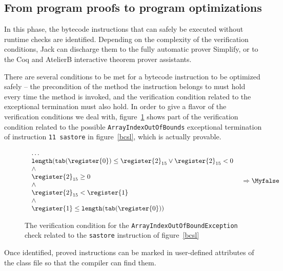 

\subsection{From program proofs to program optimizations }
\label{proofs}
In this phase, the bytecode instructions that can safely be executed without runtime checks are identified. Depending on the complexity of the verification conditions, Jack can discharge them to the fully automatic prover Simplify, or to the Coq and AtelierB interactive theorem prover assistants.

There are several conditions to be met for a bytecode instruction to be optimized safely -- the precondition of the method the instruction belongs to must hold every time the method is invoked, and the verification condition related to the exceptional termination must also hold. In order to give a flavor of the verification conditions we deal with, figure~\ref{proofs:vc} shows part of the  verification condition related to the possible \texttt{ArrayIndexOutOfBounds} exceptional termination of instruction \verb!11 sastore! in figure~\ref{bcsl}, which is actually provable.

\begin{figure}
\begin{frameit}
\[
  \begin{array}{ll}
    \begin{array}{l}
        \ldots \\
     \texttt{length} ( \texttt{tab}(  \register{0}) \leq \register{2}_{15} \vee \register{2}_{15}< 0   \\
       \wedge \\
        \register{2}_{15 } \geq 0 \\
	\wedge \\
       \register{2}_{15 }< \register{1} \\
       \wedge \\
        \register{1} \leq  \texttt{length} ( \texttt{tab}( \register{0} ) ) \\
        \end{array}
     &  \Rightarrow  \Myfalse
  \end{array}\]
\caption{\sc The verification condition for the \texttt{ArrayIndexOutOfBoundException} check related to the \texttt{sastore} instruction of figure~\ref{bcsl}}
\label{proofs:vc}
\end{frameit}
\end{figure}

Once identified, proved instructions can be marked in user-defined attributes of the class file so that the compiler can find them.
